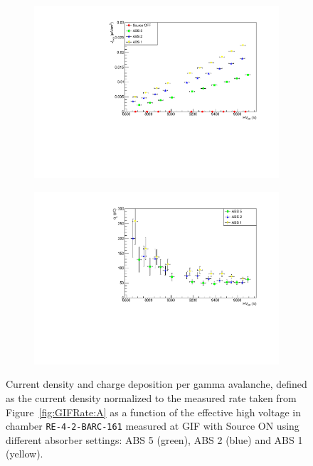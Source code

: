 	\begin{figure}[H]
    	\begin{subfigure}{0.5\linewidth}
			\centering
    		\includegraphics[width = 0.7\plotwidth]{fig/chapt5/Current-Density.pdf}
        	\caption{\label{fig:Charge:A}}
    	\end{subfigure}
    	\begin{subfigure}{0.5\linewidth}
			\centering
    		\includegraphics[width = 0.7\plotwidth]{fig/chapt5/Charge-per-gamma.pdf}
        	\caption{\label{fig:Charge:B}}
    	\end{subfigure}
		\caption{\label{fig:Charge} Current density and charge deposition per gamma avalanche, defined as the current density normalized to the measured rate taken from Figure~\ref{fig:GIFRate:A} as a function of the effective high voltage in chamber \texttt{RE-4-2-BARC-161} measured at GIF with Source ON using different absorber settings: ABS 5 (green), ABS 2 (blue) and ABS 1 (yellow).}
	\end{figure}
	
